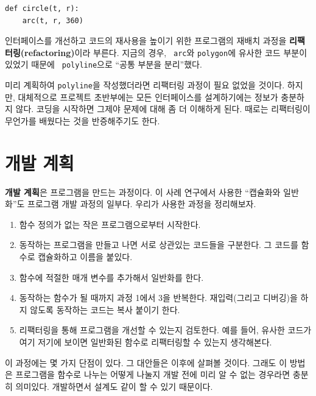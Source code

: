 \documentclass[10pt]{book}
\begin{document}
\begin{verbatim}
def circle(t, r):
    arc(t, r, 360)
\end{verbatim}
%
인터페이스를 개선하고 코드의 재사용을 높이기 위한 프로그램의 재배치
과정을 {\bf 리팩터링(refactoring)}이라 부른다.  지금의 경우, {\tt
  arc}와 {\tt polygon}에 유사한 코드 부분이 있었기 때문에 {\tt
  polyline}으로 ``공통 부분을 분리''했다.

미리 계획하여 {\tt polyline}을 작성했더라면 리팩터링 과정이 필요 없었을
것이다.  하지만, 대체적으로 프로젝트 초반부에는 모든 인터페이스를
설계하기에는 정보가 충분하지 않다.  코딩을 시작하면 그제야 문제에 대해
좀 더 이해하게 된다.  때로는 리팩터링이 무언가를 배웠다는 것을
반증해주기도 한다.


\section{개발 계획}

{\bf 개발 계획}은 프로그램을 만드는 과정이다.  이 사례 연구에서 사용한
``캡슐화와 일반화''도 프로그램 개발 과정의 일부다.  우리가 사용한
과정을 정리해보자.

\begin{enumerate}

\item 함수 정의가 없는 작은 프로그램으로부터 시작한다.

\item 동작하는 프로그램을 만들고 나면 서로 상관있는 코드들을 구분한다.
  그 코드를 함수로 캡슐화하고 이름을 붙있다.

\item 함수에 적절한 매개 변수를 추가해서 일반화를 한다. 

\item 동작하는 함수가 될 때까지 과정 1에서 3을 반복한다.  재입력(그리고
  디버깅)을 하지 않도록 동작하는 코드는 복사 붙이기 한다.

\item 리팩터링을 통해 프로그램을 개선할 수 있는지 검토한다.  예를
  들어, 유사한 코드가 여기 저기에 보이면 일반화된 함수로 리팩터링할 수
  있는지 생각해본다.

\end{enumerate}

이 과정에는 몇 가지 단점이 있다. 그 대안들은 이후에 살펴볼 것이다.  그래도 이 방법은 프로그램을 함수로 나누는 어떻게 나눌지 개발 전에 미리 알 수 없는 경우라면 충분히 의미있다.  개발하면서 설계도 같이 할 수 있기 때문이다. 
\end{document}
